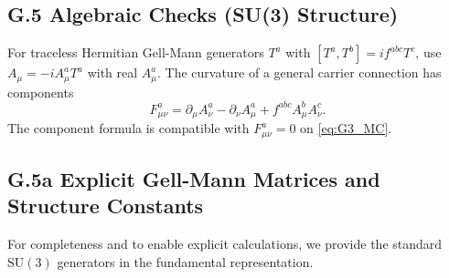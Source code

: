 \subsection*{G.5 Algebraic Checks (SU(3) Structure)}
For traceless Hermitian Gell-Mann generators $T^a$ with
$[T^a,T^b]=i f^{abc}T^c$, use $A_\mu=-i A_\mu^aT^a$ with real $A_\mu^a$.
The curvature of a general carrier connection has components
\begin{equation}
F_{\mu\nu}^a=\partial_\mu A_\nu^a-\partial_\nu A_\mu^a
  + f^{abc} A_\mu^b A_\nu^c .
\end{equation}
The component formula is compatible with $F_{\mu\nu}^a=0$ on
\eqref{eq:G3_MC}.

\subsection*{G.5a Explicit Gell-Mann Matrices and Structure Constants}
\label{sec:G5a_gellmann}

For completeness and to enable explicit calculations, we provide the standard $\mathrm{SU}(3)$ generators in the fundamental representation.

